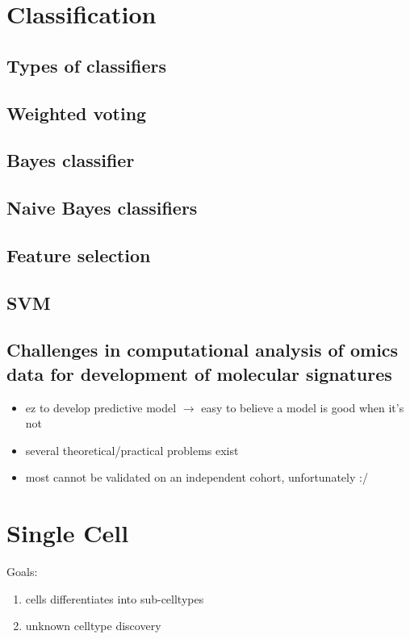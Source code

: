 \documentclass[font=12pt]{article}
\begin{document}
\newpage
\section{Classification}
\subsection{Types of classifiers}

\subsection{Weighted voting}

\subsection{Bayes classifier}

\subsection{Naive Bayes classifiers}

\subsection{Feature selection}

\subsection{SVM}

\subsection{Challenges in computational analysis of omics data for development of molecular signatures}
\begin{itemize}
	\item ez to develop predictive model $\to$ easy to believe a model is good when it's not
	\item several theoretical/practical problems exist
	\item most cannot be validated on an independent cohort, unfortunately :/
\end{itemize}

\newpage
\section{Single Cell}
Goals:
\begin{enumerate}
	\item cells differentiates into sub-celltypes
	\item unknown celltype discovery
\end{enumerate}
\end{document}
